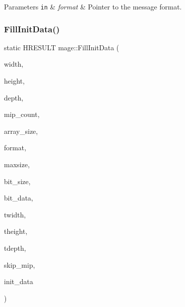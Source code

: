 \begin{DoxyParams}[1]{Parameters}
\mbox{\tt in}  & {\em format} & Pointer to the message format. \\
\hline
\end{DoxyParams}
\hypertarget{namespacemage_ac20162a68be6828c38072a3afb0711c1}{}\label{namespacemage_ac20162a68be6828c38072a3afb0711c1} 
\subsubsection{\texorpdfstring{Fill\+Init\+Data()}{FillInitData()}}
{\footnotesize\ttfamily static H\+R\+E\+S\+U\+LT mage\+::\+Fill\+Init\+Data (\begin{DoxyParamCaption}\item[{\+\_\+\+In\+\_\+ size\+\_\+t}]{width,  }\item[{\+\_\+\+In\+\_\+ size\+\_\+t}]{height,  }\item[{\+\_\+\+In\+\_\+ size\+\_\+t}]{depth,  }\item[{\+\_\+\+In\+\_\+ size\+\_\+t}]{mip\+\_\+count,  }\item[{\+\_\+\+In\+\_\+ size\+\_\+t}]{array\+\_\+size,  }\item[{\+\_\+\+In\+\_\+ D\+X\+G\+I\+\_\+\+F\+O\+R\+M\+AT}]{format,  }\item[{\+\_\+\+In\+\_\+ size\+\_\+t}]{maxsize,  }\item[{\+\_\+\+In\+\_\+ size\+\_\+t}]{bit\+\_\+size,  }\item[{\+\_\+\+In\+\_\+reads\+\_\+bytes\+\_\+(bit\+\_\+size) const uint8\+\_\+t $\ast$}]{bit\+\_\+data,  }\item[{\+\_\+\+Out\+\_\+ size\+\_\+t \&}]{twidth,  }\item[{\+\_\+\+Out\+\_\+ size\+\_\+t \&}]{theight,  }\item[{\+\_\+\+Out\+\_\+ size\+\_\+t \&}]{tdepth,  }\item[{\+\_\+\+Out\+\_\+ size\+\_\+t \&}]{skip\+\_\+mip,  }\item[{\+\_\+\+Out\+\_\+writes\+\_\+(mip\+\_\+count $\ast$array\+\_\+size) D3\+D11\+\_\+\+S\+U\+B\+R\+E\+S\+O\+U\+R\+C\+E\+\_\+\+D\+A\+TA $\ast$}]{init\+\_\+data }\end{DoxyParamCaption})\hspace{0.3cm}{\ttfamily [static]}}

\hypertarget{namespacemage_ab2e62d950dc620167f4128cb16033998}{}\label{namespacemage_ab2e62d950dc620167f4128cb16033998} 
